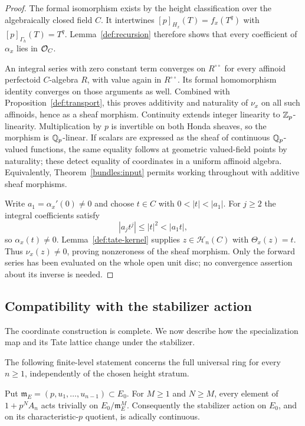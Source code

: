 \begin{proof}
The formal isomorphism exists by the height classification over the
algebraically closed field $C$.  It intertwines $[p]_{H_x}(T)=f_x(T^q)$
with $[p]_{\Gamma_h}(T)=T^q$.  Lemma~\ref{def:recursion} therefore shows
that every coefficient of $\alpha_x$ lies in $\mathcal O_C$.

An integral series with zero constant term converges on
$R^{\circ\circ}$ for every affinoid perfectoid $C$-algebra $R$, with
value again in $R^{\circ\circ}$.  Its formal homomorphism identity
converges on those arguments as well.  Combined with
Proposition~\ref{def:transport}, this proves additivity and naturality of
$\nu_x$ on all such affinoids, hence as a sheaf morphism.
Continuity extends integer linearity to $\mathbb Z_p$-linearity.  Multiplication
by $p$ is invertible on both Honda sheaves, so the morphism is
$\mathbb Q_p$-linear.  If scalars are expressed as the sheaf of continuous
$\mathbb Q_p$-valued functions, the same equality follows at geometric
valued-field points by naturality; these detect equality of coordinates
in a uniform affinoid algebra.  Equivalently,
Theorem~\ref{bundles:input} permits working throughout with additive
sheaf morphisms.

Write $a_1=\alpha_x'(0)\ne0$ and choose
$t\in C$ with $0<|t|<|a_1|$.  For $j\ge2$ the integral coefficients
satisfy
\[
 |a_jt^j|\le|t|^2<|a_1t|,
\]
so $\alpha_x(t)\ne0$.  Lemma~\ref{def:tate-kernel} supplies
$z\in\mathcal H_n(C)$ with $\Theta_x(z)=t$.
Thus $\nu_x(z)\ne0$, proving nonzeroness of the sheaf morphism.
Only the forward series has been evaluated on the whole open unit disc;
no convergence assertion about its inverse is needed.
\end{proof}

\subsection{Compatibility with the stabilizer action}

The coordinate construction is complete.  We now describe how the
specialization map and its Tate lattice change under the stabilizer.

The following finite-level statement concerns the full universal ring
for every $n\geq1$, independently of the chosen height stratum.

\begin{lemma}
\label{def:continuous-action}
Put $\mathfrak m_E=(p,u_1,\ldots,u_{n-1})\subset E_0$.
For $M\geq1$ and $N\geq M$, every element of $1+p^NA_n$ acts
trivially on $E_0/\mathfrak m_E^M$.  Consequently the stabilizer action
on $E_0$, and on its characteristic-$p$ quotient, is adically continuous.
\end{lemma}

